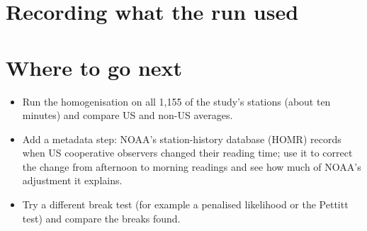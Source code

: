 \section{Recording what the run used}


\section{Where to go next}
\begin{itemize}
\item Run the homogenisation on all 1,155 of the study's stations (about ten minutes) and compare US and non-US averages.
\item Add a metadata step: NOAA's station-history database (HOMR) records when US cooperative observers changed their reading time; use it to correct the change from afternoon to morning readings and see how much of NOAA's adjustment it explains.
\item Try a different break test (for example a penalised likelihood or the Pettitt test) and compare the breaks found.
\end{itemize}
